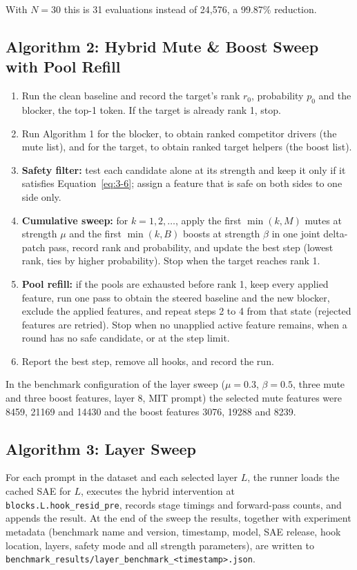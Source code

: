 \documentclass[12pt,a4paper]{report}
\begin{document}
With $N = 30$ this is 31 evaluations instead of 24,576, a 99.87\% reduction.

\subsection{Algorithm 2: Hybrid Mute \& Boost Sweep with Pool Refill}

\begin{enumerate}
  \item Run the clean baseline and record the target's rank $r_0$, probability $p_0$ and the blocker, the top-1 token. If the target is already rank 1, stop.
  \item Run Algorithm 1 for the blocker, to obtain ranked competitor drivers (the mute list), and for the target, to obtain ranked target helpers (the boost list).
  \item \textbf{Safety filter:} test each candidate alone at its strength and keep it only if it satisfies Equation~\ref{eq:3-6}; assign a feature that is safe on both sides to one side only.
  \item \textbf{Cumulative sweep:} for $k = 1, 2, \ldots$, apply the first $\min(k, M)$ mutes at strength $\mu$ and the first $\min(k, B)$ boosts at strength $\beta$ in one joint delta-patch pass, record rank and probability, and update the best step (lowest rank, ties by higher probability). Stop when the target reaches rank 1.
  \item \textbf{Pool refill:} if the pools are exhausted before rank 1, keep every applied feature, run one pass to obtain the steered baseline and the new blocker, exclude the applied features, and repeat steps 2 to 4 from that state (rejected features are retried). Stop when no unapplied active feature remains, when a round has no safe candidate, or at the step limit.
  \item Report the best step, remove all hooks, and record the run.
\end{enumerate}

In the benchmark configuration of the layer sweep ($\mu = 0.3$, $\beta = 0.5$, three mute and three boost features, layer 8, MIT prompt) the selected mute features were 8459, 21169 and 14430 and the boost features 3076, 19288 and 8239.

\subsection{Algorithm 3: Layer Sweep}

For each prompt in the dataset and each selected layer $L$, the runner loads the cached SAE for $L$, executes the hybrid intervention at \texttt{blocks.\allowbreak{}L.\allowbreak{}hook\_\allowbreak{}resid\_\allowbreak{}pre}, records stage timings and forward-pass counts, and appends the result. At the end of the sweep the results, together with experiment metadata (benchmark name and version, timestamp, model, SAE release, hook location, layers, safety mode and all strength parameters), are written to \texttt{benchmark\_\allowbreak{}results/\allowbreak{}layer\_\allowbreak{}benchmark\_\allowbreak{}<timestamp>.\allowbreak{}json}.
\end{document}
